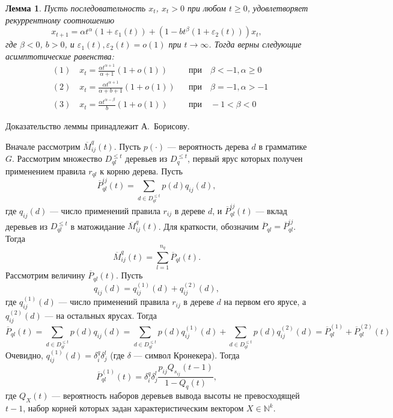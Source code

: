 \documentclass[12pt]{article}
\renewcommand{\leq}{\leqslant}
\renewcommand{\geq}{\geqslant}
\renewcommand{\epsilon}{\varepsilon}
\newtheorem{lemma}{Лемма}
\begin{document}
\begin{lemma}
\label{l:xab}
	Пусть последовательность $x_t$, $x_t > 0$ при любом $t \geq 0$, удовлетворяет рекуррентному соотношению
	\begin{equation*}
		x_{t+1} = \alpha t^\alpha (1 + \epsilon_1(t)) + (1 - b t^\beta (1 + \epsilon_2(t))) x_t,
	\end{equation*}
	где $\beta < 0$, $b > 0$, и $\epsilon_1(t), \epsilon_2(t) = o(1)$ при $t \rightarrow \infty$. Тогда верны следующие асимптотические равенства:
	\begin{align}
		&(1)\quad x_t = \frac{\alpha t^{\alpha + 1}}{\alpha + 1} (1 + o(1))     & &\text{при}\quad \beta < -1, \alpha \geq 0 \\
		&(2)\quad x_t = \frac{\alpha t^{\alpha + 1}}{\alpha + b + 1} (1 + o(1)) & &\text{при}\quad \beta = -1, \alpha > -1 \\
		&(3)\quad x_t = \frac{\alpha t^{\alpha - \beta}}{b} (1 + o(1))          & &\text{при}\quad -1 < \beta < 0
	\end{align}
\end{lemma}
Доказательство леммы принадлежит А.~Борисову.

Вначале рассмотрим $\overline{M}^q_{ij}(t)$. Пусть $p(\cdot)$ --- вероятность дерева $d$ в грамматике $G$. Рассмотрим множество $D^{\leq t}_{ql}$ деревьев из $D^{\leq t}_q$, первый ярус которых получен применением правила $r_{ql}$ к корню дерева. Пусть
\begin{equation*}
	\overline{P}^{ij}_{ql}(t) = \sum_{d \in D^{\leq t}_{ql}} p(d) q_{ij}(d),
\end{equation*}
где $q_{ij}(d)$ --- число применений правила $r_{ij}$ в дереве $d$, и $\overline{P}^{ij}_{ql}(t)$ --- вклад деревьев из $D^{\leq t}_{ql}$ в матожидание $\overline{M}^q_{ij}(t)$. Для краткости, обозначим $\overline{P}_{ql} = \overline{P}^{ij}_{ql}$. Тогда
\begin{equation}
\label{eq:m_line_sum}
	\overline{M}^q_{ij}(t) = \sum_{l = 1}^{n_q} \overline{P}_{ql}(t).
\end{equation}
Рассмотрим величину $\overline{P}_{ql}(t)$. Пусть
\begin{equation*}
	q_{ij}(d) = q^{(1)}_{ij}(d) + q^{(2)}_{ij}(d),
\end{equation*}
где $q^{(1)}_{ij}(d)$ --- число применений правила $r_{ij}$ в дереве $d$ на первом его ярусе, а $q^{(2)}_{ij}(d)$ --- на остальных ярусах. Тогда
\begin{equation*}
	\overline{P}_{ql}(t) = \sum_{d \in D^{\leq t}_{ql}} p(d) q_{ij}(d) = \sum_{d \in D^{\leq t}_{ql}} p(d) q^{(1)}_{ij}(d) + \sum_{d \in D^{\leq t}_{ql}} p(d) q^{(2)}_{ij}(d) = \overline{P}^{(1)}_{ql} + \overline{P}^{(2)}_{ql}(t)
\end{equation*}
Очевидно, $q^{(1)}_{ij}(d) = \delta^q_i \delta^l_j$ (где $\delta$ --- символ Кронекера). Тогда
\begin{equation*}
	\overline{P}^{(1)}_{ql}(t) = \delta^q_i \delta^l_j \frac{p_{ij} Q_{s_{ij}}(t-1)}{1 - Q_q(t)},
\end{equation*}
где $Q_X(t)$ --- вероятность наборов деревьев вывода высоты не превосходящей $t-1$, набор корней которых задан характеристическим вектором $X \in \mathbb{N}^k$.
\end{document}
